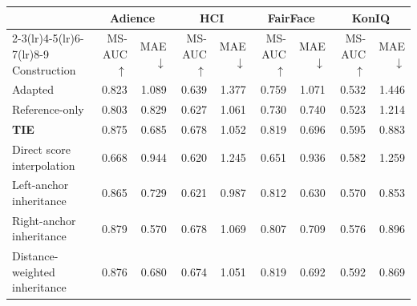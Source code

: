 \begin{tabular*}{\textwidth}{@{}l@{\extracolsep{\fill}}*{8}{r}@{}}
\toprule
 & \multicolumn{2}{c}{Adience} & \multicolumn{2}{c}{HCI} & \multicolumn{2}{c}{FairFace} & \multicolumn{2}{c}{KonIQ} \\
\cmidrule(lr){2-3}\cmidrule(lr){4-5}\cmidrule(lr){6-7}\cmidrule(lr){8-9}
Construction & MS-AUC $\uparrow$ & MAE $\downarrow$ & MS-AUC $\uparrow$ & MAE $\downarrow$ & MS-AUC $\uparrow$ & MAE $\downarrow$ & MS-AUC $\uparrow$ & MAE $\downarrow$ \\
\midrule
Adapted & 0.823 & 1.089 & 0.639 & 1.377 & 0.759 & 1.071 & 0.532 & 1.446 \\
Reference-only & 0.803 & 0.829 & 0.627 & 1.061 & 0.730 & 0.740 & 0.523 & 1.214 \\
\textbf{TIE} & 0.875 & 0.685 & 0.678 & 1.052 & 0.819 & 0.696 & 0.595 & 0.883 \\
Direct score interpolation & 0.668 & 0.944 & 0.620 & 1.245 & 0.651 & 0.936 & 0.582 & 1.259 \\
Left-anchor inheritance & 0.865 & 0.729 & 0.621 & 0.987 & 0.812 & 0.630 & 0.570 & 0.853 \\
Right-anchor inheritance & 0.879 & 0.570 & 0.678 & 1.069 & 0.807 & 0.709 & 0.576 & 0.896 \\
Distance-weighted inheritance & 0.876 & 0.680 & 0.674 & 1.051 & 0.819 & 0.692 & 0.592 & 0.869 \\
\bottomrule
\end{tabular*}
